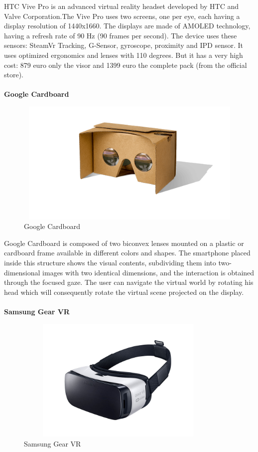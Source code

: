 HTC Vive Pro is an advanced virtual reality headset developed by HTC and Valve Corporation.The Vive Pro uses two screens, one per eye, each having a display resolution of 1440x1660. The displays are made of AMOLED technology, having a refresh rate of 90 Hz (90 frames per second). The device uses these sensors: SteamVr Tracking, G-Sensor, gyroscope, proximity and IPD sensor. It uses optimized ergonomics and lenses with 110 degrees. But it has a very high cost: 879 euro only the visor and 1399 euro the complete pack (from the official store).\\
\\
\textbf{Google Cardboard}
\begin{figure}[H]
\centering
\includegraphics[width=12cm, height=6cm]{immagini/cardboard.png}
\caption{Google Cardboard}\label{fig:cardboard}
\end{figure}
Google Cardboard is composed of two biconvex lenses mounted on a plastic or cardboard frame available in different colors and shapes. The smartphone placed inside this structure shows the visual contents, subdividing them into two-dimensional images with two identical dimensions, and the interaction is obtained through the focused gaze. The user can navigate the virtual world by rotating his head which will consequently rotate the virtual scene projected on the display.\\
\\
\textbf{Samsung Gear VR}
\begin{figure}[H]
\centering
\includegraphics[width=10cm, height=6cm]{immagini/gear.jpg}
\caption{Samsung Gear VR}\label{fig:gearvr}
\end{figure}
